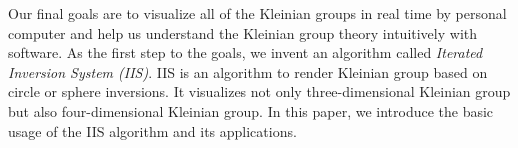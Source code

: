 Our final goals are to visualize all of the Kleinian groups in real time by
personal computer and help us understand the Kleinian group theory
intuitively with software.
As the first step to the goals, we invent an algorithm called
\textit{Iterated Inversion System (IIS)}.
IIS is an algorithm to render Kleinian group based on circle or sphere
inversions.
It visualizes not only three-dimensional Kleinian group but also
four-dimensional Kleinian group.
In this paper, we introduce the basic usage of the IIS algorithm and its
applications.

